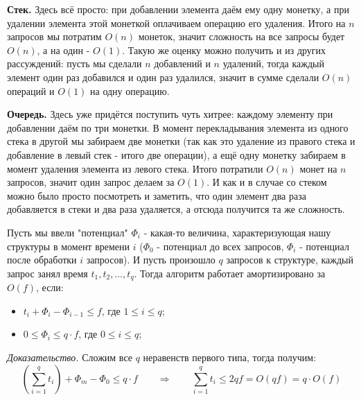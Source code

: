 \textbf{Стек.} Здесь всё просто: при добавлении элемента даём ему одну монетку, а при удалении элемента этой монеткой оплачиваем операцию его удаления. Итого на $n$ запросов мы потратим $O(n)$ монеток, значит сложность на все запросы будет $O(n)$, а на один - $O(1)$. Такую же оценку можно получить и из других рассуждений: пусть мы сделали $n$ добавлений и $n$ удалений, тогда каждый элемент один раз добавился и один раз удалился, значит в сумме сделали $O(n)$ операций и $O(1)$ на одну операцию.

\textbf{Очередь.} Здесь уже придётся поступить чуть хитрее: каждому элементу при добавлении даём по три монетки. В момент перекладывания элемента из одного стека в другой мы забираем две монетки (так как это удаление из правого стека и добавление в левый стек - итого две операции), а ещё одну монетку забираем в момент удаления элемента из левого стека. Итого потратили $O(n)$ монет на $n$ запросов, значит один запрос делаем за $O(1)$. И как и в случае со стеком можно было просто посмотреть и заметить, что один элемент два раза добавляется в стеки и два раза удаляется, а отсюда получится та же сложность.


Пусть мы ввели "потенциал" $\Phi_i$ - какая-то величина, характеризующая нашу структуры в момент времени $i$ ($\Phi_0$ - потенциал до всех запросов, $\Phi_i$ - потенциал после обработки $i$ запросов). И пусть произошло $q$ запросов к структуре, каждый запрос занял время $t_1, t_2, \ldots, t_q$. Тогда алгоритм работает амортизировано за $O(f)$, если:
\begin{itemize}
    \item $t_i + \Phi_i - \Phi_{i-1} \leq f$, где $1 \leq i \leq q$;
    \item $0 \leq \Phi_i \leq q \cdot f$, где $0 \leq i \leq q$;
\end{itemize}

\textit{Доказательство.} Сложим все $q$ неравенств первого типа, тогда получим:
$$\left(\sum_{i=1}^q t_i \right) + \Phi_m - \Phi_0 \leq q \cdot f \qquad \Rightarrow \qquad \sum_{i=1}^q t_i \leq 2 q f = O(qf) = q \cdot O(f)$$


